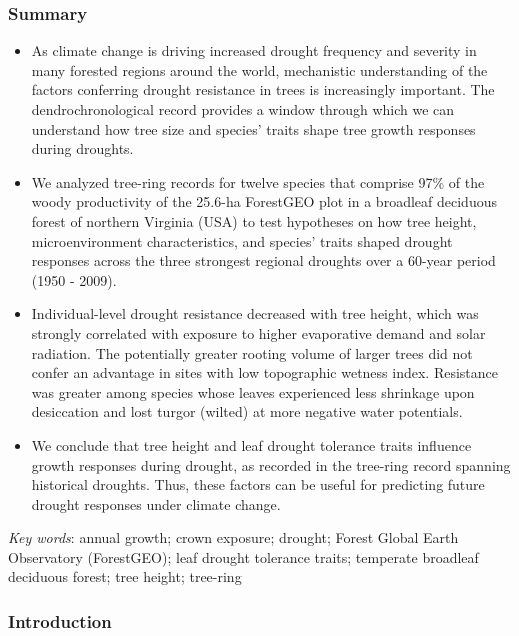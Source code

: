 \documentclass[
]{article}
\begin{document}
\newpage

\hypertarget{summary}{%
\subsubsection{Summary}\label{summary}}

\begin{itemize}
\item
  As climate change is driving increased drought frequency and severity
  in many forested regions around the world, mechanistic understanding
  of the factors conferring drought resistance in trees is increasingly
  important. The dendrochronological record provides a window through
  which we can understand how tree size and species' traits shape tree
  growth responses during droughts.
\item
  We analyzed tree-ring records for twelve species that comprise 97\% of
  the woody productivity of the 25.6-ha ForestGEO plot in a broadleaf
  deciduous forest of northern Virginia (USA) to test hypotheses on how
  tree height, microenvironment characteristics, and species' traits
  shaped drought responses across the three strongest regional droughts
  over a 60-year period (1950 - 2009).
\item
  Individual-level drought resistance decreased with tree height, which
  was strongly correlated with exposure to higher evaporative demand and
  solar radiation. The potentially greater rooting volume of larger
  trees did not confer an advantage in sites with low topographic
  wetness index. Resistance was greater among species whose leaves
  experienced less shrinkage upon desiccation and lost turgor (wilted)
  at more negative water potentials.
\item
  We conclude that tree height and leaf drought tolerance traits
  influence growth responses during drought, as recorded in the
  tree-ring record spanning historical droughts. Thus, these factors can
  be useful for predicting future drought responses under climate
  change.
\end{itemize}

\emph{Key words}: annual growth; crown exposure; drought; Forest Global
Earth Observatory (ForestGEO); leaf drought tolerance traits; temperate
broadleaf deciduous forest; tree height; tree-ring

\newpage

\hypertarget{introduction}{%
\subsubsection{Introduction}\label{introduction}}
\end{document}
